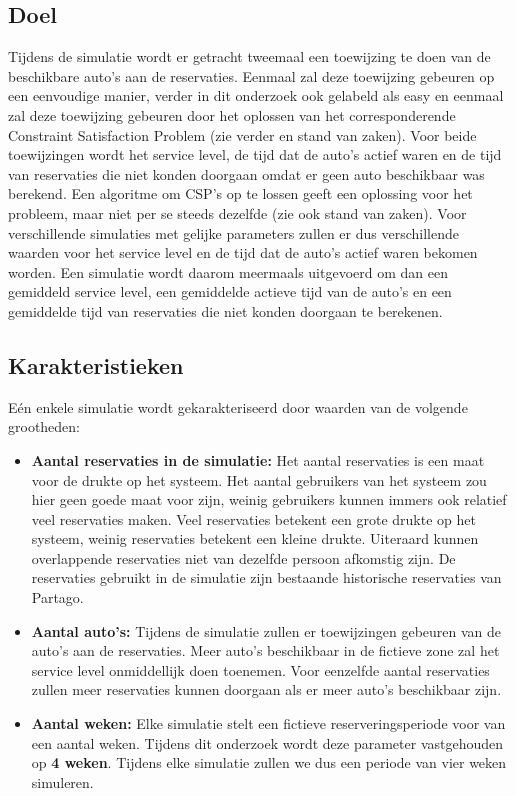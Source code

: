 \subsection{Doel}
Tijdens de simulatie wordt er getracht tweemaal een toewijzing te doen van de beschikbare auto's aan de reservaties. Eenmaal zal deze toewijzing gebeuren op een eenvoudige manier, verder in dit onderzoek ook gelabeld als easy en eenmaal zal deze toewijzing gebeuren door het oplossen van het corresponderende Constraint Satisfaction Problem (zie verder en stand van zaken). Voor beide toewijzingen wordt het service level, de tijd dat de auto's actief waren en de tijd van reservaties die niet konden doorgaan omdat er geen auto beschikbaar was berekend. Een algoritme om CSP's op te lossen geeft een oplossing voor het probleem, maar niet per se steeds dezelfde (zie ook stand van zaken). Voor verschillende simulaties met gelijke parameters zullen er dus verschillende waarden voor het service level en de tijd dat de auto's actief waren bekomen worden. Een simulatie wordt daarom meermaals uitgevoerd om dan een gemiddeld service level, een gemiddelde actieve tijd van de auto's en een gemiddelde tijd van reservaties die niet konden doorgaan te berekenen.   

\subsection{Karakteristieken}
Eén enkele simulatie wordt gekarakteriseerd door waarden van de volgende grootheden:
\begin{itemize}
	\item \textbf{Aantal reservaties in de simulatie:}
	Het aantal reservaties is een maat voor de drukte op het systeem. Het aantal gebruikers van het systeem zou hier geen goede maat voor zijn, weinig gebruikers kunnen immers ook relatief veel reservaties maken. Veel reservaties betekent een grote drukte op het systeem, weinig reservaties betekent een kleine drukte. Uiteraard kunnen overlappende reservaties niet van dezelfde persoon afkomstig zijn. De reservaties gebruikt in de simulatie zijn bestaande historische reservaties van Partago.
	\item \textbf{Aantal auto's:}
	Tijdens de simulatie zullen er toewijzingen gebeuren van de auto's aan de reservaties. Meer auto's beschikbaar in de fictieve zone zal het service level onmiddellijk doen toenemen. Voor eenzelfde aantal reservaties zullen meer reservaties kunnen doorgaan als er meer auto's beschikbaar zijn. 
	\item \textbf{Aantal weken:}
	Elke simulatie stelt een fictieve reserveringsperiode voor van een aantal weken. Tijdens dit onderzoek wordt deze parameter vastgehouden op \textbf{4 weken}. Tijdens elke simulatie zullen we dus een periode van vier weken simuleren. 
\end{itemize} 

